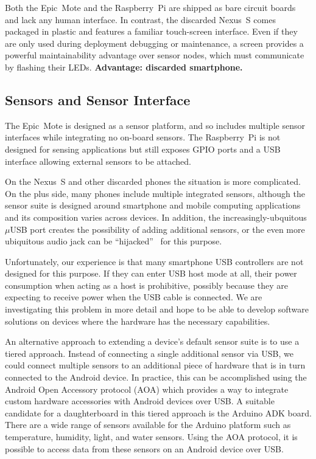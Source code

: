 Both the Epic~Mote and the Raspberry~Pi are shipped as bare circuit boards
and lack any human interface. In contrast, the discarded Nexus~S comes
packaged in plastic and features a familiar touch-screen interface. Even if
they are only used during deployment debugging or maintenance, a screen
provides a powerful maintainability advantage over sensor nodes, which must
communicate by flashing their LEDs. \textbf{Advantage: discarded smartphone.}

\subsection{Sensors and Sensor Interface}

The Epic~Mote is designed as a sensor platform, and so includes multiple
sensor interfaces while integrating no on-board sensors. The Raspberry~Pi is
not designed for sensing applications but still exposes GPIO ports and a USB
interface allowing external sensors to be attached.

On the Nexus~S and other discarded phones the situation is more complicated.
On the plus side, many phones include multiple integrated sensors, although
the sensor suite is designed around smartphone and mobile computing
applications and its composition varies across devices. In addition, the
increasingly-ubquitous $\mu$USB port creates the possibility of adding
additional sensors, or the even more ubiquitous audio jack can be
``hijacked''~\cite{hijack-dev10} for this purpose.

Unfortunately, our experience is that many smartphone USB controllers are not
designed for this purpose. If they can enter USB host mode at all, their
power consumption when acting as a host is prohibitive, possibly because they
are expecting to receive power when the USB cable is connected. We are
investigating this problem in more detail and hope to be able to develop
software solutions on devices where the hardware has the necessary
capabilities.

An alternative approach to extending a device's default sensor suite is to
use a tiered approach. Instead of connecting a single additional sensor via
USB, we could connect multiple sensors to an additional piece of hardware
that is in turn connected to the Android device. In practice, this can be
accomplished using the Android Open Accessory protocol (AOA) which provides a
way to integrate custom hardware accessories with Android devices over USB. A
suitable candidate for a daughterboard in this tiered approach is the Arduino
ADK board. There are a wide range of sensors available for the Arduino
platform such as temperature, humidity, light, and water sensors. Using the
AOA protocol, it is possible to access data from these sensors on an Android
device over USB.

